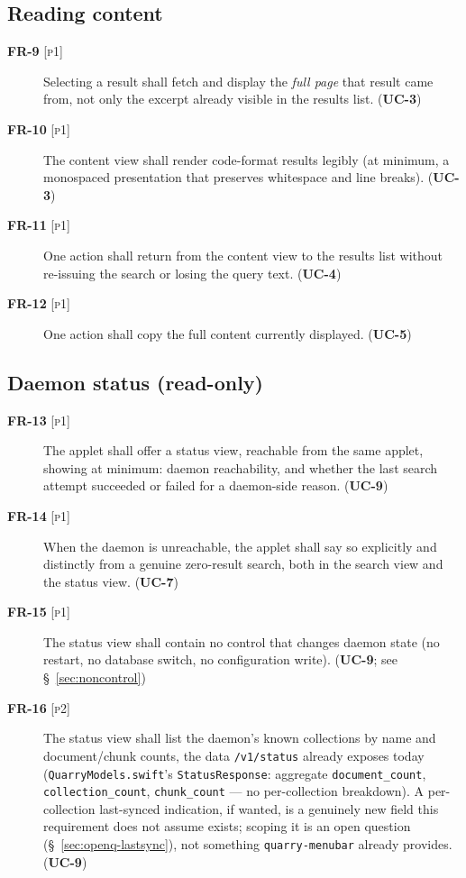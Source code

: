 \documentclass[a4paper,11pt]{report}
\newcommand{\uc}[1]{\textbf{UC-#1}}
\newcommand{\fr}[1]{\textbf{FR-#1}}
\newcommand{\pone}{\textsc{[p1]}}
\newcommand{\ptwo}{\textsc{[p2]}}
\begin{document}
\subsection{Reading content}

\begin{description}
  \item[\fr{9} \pone{}] Selecting a result shall fetch and display the
    \emph{full page} that result came from, not only the excerpt already
    visible in the results list. (\uc{3})
  \item[\fr{10} \pone{}] The content view shall render code-format
    results legibly (at minimum, a monospaced presentation that preserves
    whitespace and line breaks). (\uc{3})
  \item[\fr{11} \pone{}] One action shall return from the content view to
    the results list without re-issuing the search or losing the query
    text. (\uc{4})
  \item[\fr{12} \pone{}] One action shall copy the full content currently
    displayed. (\uc{5})
\end{description}

\subsection{Daemon status (read-only)}

\begin{description}
  \item[\fr{13} \pone{}] The applet shall offer a status view, reachable
    from the same applet, showing at minimum: daemon reachability, and
    whether the last search attempt succeeded or failed for a
    daemon-side reason. (\uc{9})
  \item[\fr{14} \pone{}] When the daemon is unreachable, the applet shall
    say so explicitly and distinctly from a genuine zero-result search,
    both in the search view and the status view. (\uc{7})
  \item[\fr{15} \pone{}] The status view shall contain no control that
    changes daemon state (no restart, no database switch, no
    configuration write). (\uc{9}; see \S~\ref{sec:noncontrol})
  \item[\fr{16} \ptwo{}] The status view shall list the daemon's known
    collections by name and document/chunk counts, the data
    \texttt{/v1/status} already exposes today
    (\texttt{QuarryModels.swift}'s \texttt{StatusResponse}: aggregate
    \texttt{document\_count}, \texttt{collection\_count},
    \texttt{chunk\_count} --- no per-collection breakdown). A
    per-collection last-synced indication, if wanted, is a genuinely new
    field this requirement does not assume exists; scoping it is an open
    question (\S~\ref{sec:openq-lastsync}), not something
    \texttt{quarry-menubar} already provides. (\uc{9})
\end{description}
\end{document}

